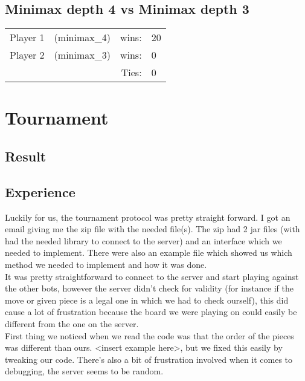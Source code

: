 \documentclass[12pt, a4paper]{article}
\begin{document}
\subsection{Minimax depth 4 vs Minimax depth 3}
  \begin{tabular}{| l  l  r l |}
    \hline
 	Player 1 & (minimax\_4) & wins: & 20 \\
 	Player 2 & (minimax\_3) & wins: & 0 \\
 	& &  Ties: & 0 \\
    \hline
  \end{tabular}

\section{Tournament}

\subsection{}

\subsection{Result}

\subsection{Experience}
Luckily for us, the tournament protocol was pretty straight forward. I got an email giving me the zip file with the needed file(s). The zip had 2 jar files (with had the needed library to connect to the server) and an interface which we needed to implement. There were also an example file which showed us which method we needed to implement and how it was done. \\
It was pretty straightforward to connect to the server and start playing against the other bots, however the server didn't check for validity (for instance if the move or given piece is a legal one in which we had to check ourself), this did cause a lot of frustration because the board we were playing on could easily be different from the one on the server. \\
First thing we noticed when we read the code was that the order of the pieces was different than ours. <insert example here>, but we fixed this easily by tweaking our code.
There's also a bit of frustration involved when it comes to debugging, the server seems to be random.

 
\end{document}
